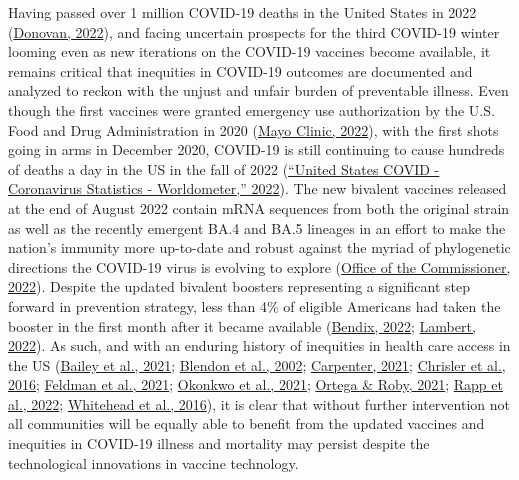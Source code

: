 \documentclass[
]{article}
\begin{document}
Having passed over 1 million COVID-19 deaths in the United States in 2022
(\protect\hyperlink{ref-donovan_us_2022}{Donovan, 2022}), and facing uncertain prospects for the third COVID-19 winter
looming even as new iterations on the COVID-19 vaccines become available, it
remains critical that inequities in COVID-19 outcomes are documented and
analyzed to reckon with the unjust and unfair burden of preventable illness.
Even though the first vaccines were granted emergency use authorization by the
U.S. Food and Drug Administration in 2020 (\protect\hyperlink{ref-mayo_clinic_history_2022}{Mayo Clinic, 2022}), with the
first shots going in arms in December 2020, COVID-19 is still continuing to
cause hundreds of deaths a day in the US in the fall of 2022
(\protect\hyperlink{ref-noauthor_united_2022}{{``United {States} {COVID} - {Coronavirus} {Statistics} - {Worldometer},''} 2022}). The new bivalent vaccines released at the end of
August 2022 contain mRNA sequences from both the original strain as well as the
recently emergent BA.4 and BA.5 lineages in an effort to make the nation's
immunity more up-to-date and robust against the myriad of phylogenetic
directions the COVID-19 virus is evolving to explore
(\protect\hyperlink{ref-office_of_the_commissioner_coronavirus_2022}{Office of the Commissioner, 2022}). Despite the updated bivalent
boosters representing a significant step forward in prevention strategy, less
than 4\% of eligible Americans had taken the booster in the first month after it
became available (\protect\hyperlink{ref-bendix_less_2022}{Bendix, 2022}; \protect\hyperlink{ref-lambert_most_2022}{Lambert, 2022}). As such, and with an
enduring history of inequities in health care access in the US
(\protect\hyperlink{ref-bailey_how_2021}{Bailey et al., 2021}; \protect\hyperlink{ref-blendon_inequities_2002}{Blendon et al., 2002}; \protect\hyperlink{ref-carpenter_health_2021}{Carpenter, 2021}; \protect\hyperlink{ref-chrisler_ageism_2016}{Chrisler et al., 2016}; \protect\hyperlink{ref-feldman_health_2021}{Feldman et al., 2021}; \protect\hyperlink{ref-okonkwo_covid-19_2021}{Okonkwo et al., 2021}; \protect\hyperlink{ref-ortega_ending_2021}{Ortega \& Roby, 2021}; \protect\hyperlink{ref-rapp_statelevel_2022}{Rapp et al., 2022}; \protect\hyperlink{ref-whitehead_outness_2016}{Whitehead et al., 2016}), it is clear that without further intervention not all
communities will be equally able to benefit from the updated vaccines and
inequities in COVID-19 illness and mortality may persist despite the
technological innovations in vaccine technology.
\end{document}

